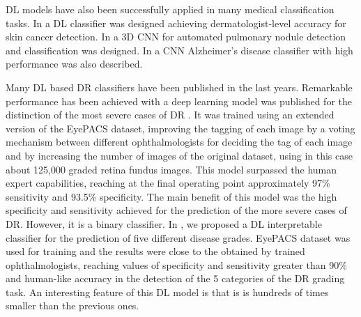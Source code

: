 \documentclass[review]{elsarticle}
\theoremstyle{definition} %
\theoremstyle{remark}
\begin{document}
DL models have also been successfully applied in many medical classification tasks. In \cite{esteva2017dermatologist} a DL classifier was designed achieving dermatologist-level accuracy for skin cancer detection. In \cite{wentao2018deeplung} a 3D CNN for automated pulmonary nodule detection and classification was designed. In \cite{wang2018classification} a CNN Alzheimer's disease classifier with high performance was also described. 

Many DL based DR classifiers have been published in the last years. 
Remarkable performance has been achieved with a deep learning model was published for the distinction of the most severe cases of DR \cite{doi:10.1001/jama.2016.17216}. It was trained using an extended version of the EyePACS dataset, improving the tagging of each image by a voting mechanism between different ophthalmologists for deciding the tag of each image and by increasing the number of images of the original dataset, using in this case about 125,000 graded retina fundus images. This model surpassed the human expert capabilities, reaching at the final operating point approximately  97\% sensitivity and 93.5\% specificity. The main benefit of this model was the high specificity and sensitivity achieved for the prediction of the more severe cases of DR. However, it is a binary classifier. In \cite{de2017deep}, we proposed a DL interpretable classifier for the prediction of five different disease grades. EyePACS dataset was used for training and the results were close to the obtained by trained ophthalmologists, reaching values of specificity and sensitivity greater than 90\% and human-like accuracy in the detection of the 5 categories of the DR grading task. An interesting feature of this DL model is that is is hundreds of times smaller than the previous ones.
\end{document}
